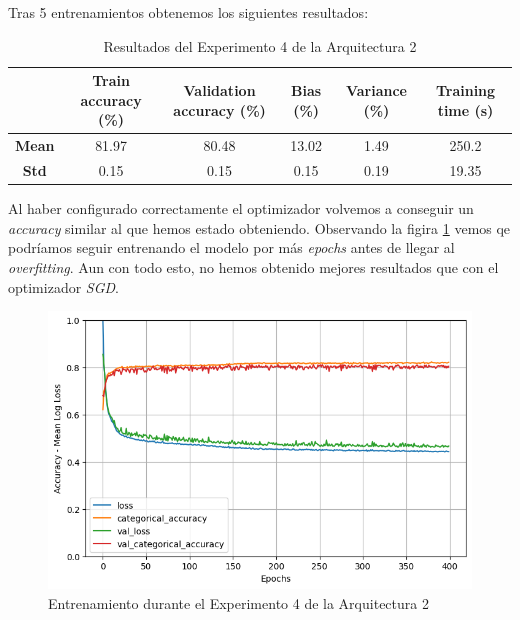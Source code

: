 \documentclass{article}
\begin{document}
			Tras 5 entrenamientos obtenemos los siguientes resultados:
			
			\begin{table}[!h]
				\begin{center}
					\begin{tabular}{ c | c | c | c | c | c |}
						\ & \textbf{Train accuracy (\%)} & \textbf{Validation accuracy (\%)} & \textbf{Bias (\%)} & \textbf{Variance (\%)} & \textbf{Training time (s)} \\ \hline
						\textbf{Mean} & 81.97 & 80.48 & 13.02 & 1.49 & 250.2 \\ \hline
						\textbf{Std} & 0.15 & 0.15 & 0.15 & 0.19 & 19.35 \\ \hline
					\end{tabular}
					\caption{Resultados del Experimento 4 de la Arquitectura 2}
					\label{tab:res-d-a2-e4}
				\end{center}
			\end{table}
			
			Al haber configurado correctamente el optimizador volvemos a conseguir un \textit{accuracy} similar al que hemos estado obteniendo. Observando la figira \ref{d-tr-a2-e4} vemos qe podr\'iamos seguir entrenando el modelo por m\'as \textit{epochs} antes de llegar al \textit{overfitting}. Aun con todo esto, no hemos obtenido mejores resultados que con el optimizador \textit{SGD}.
			\begin{figure}[!h]
				\begin{center}
					\includegraphics[scale=0.5]{d-tr-a2-e4.png}		
					\caption{Entrenamiento durante el Experimento 4 de la Arquitectura 2}	
					\label{d-tr-a2-e4}
				\end{center}
			\end{figure}
			
\end{document}
